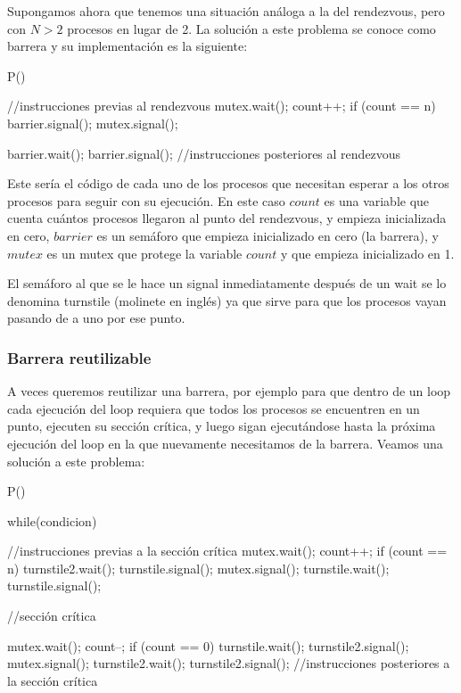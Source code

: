 \documentclass{article}
\begin{document}
Supongamos ahora que tenemos una situaci\'on an\'aloga a la del rendezvous, pero con $N > 2$ procesos en lugar de 2. La soluci\'on a este problema se conoce como barrera y su implementaci\'on es la siguiente:

\begin{code}
P()
{
    //instrucciones previas al rendezvous
    mutex.wait();
    count++;
    if (count == n)
        barrier.signal();
    mutex.signal();
    
    barrier.wait();
    barrier.signal();
    //instrucciones posteriores al rendezvous
}
\end{code}

Este ser\'ia el c\'odigo de cada uno de los procesos que necesitan esperar a los otros procesos para seguir con su ejecuci\'on. En este caso $count$ es una variable que cuenta cu\'antos procesos llegaron al punto del rendezvous, y empieza inicializada en cero, $barrier$ es un sem\'aforo que empieza inicializado en cero (la barrera), y $mutex$ es un mutex que protege la variable $count$ y que empieza inicializado en 1.

El sem\'aforo al que se le hace un signal inmediatamente despu\'es de un wait se lo denomina turnstile (molinete en ingl\'es) ya que sirve para que los procesos vayan pasando de a uno por ese punto.

\subsubsection{Barrera reutilizable}

A veces queremos reutilizar una barrera, por ejemplo para que dentro de un loop cada ejecuci\'on del loop requiera que todos los procesos se encuentren en un punto, ejecuten su secci\'on cr\'itica, y luego sigan ejecut\'andose hasta la pr\'oxima ejecuci\'on del loop en la que nuevamente necesitamos de la barrera. Veamos una soluci\'on a este problema:

\begin{code}
P()
{
    while(condicion)
		{
		    //instrucciones previas a la sección crítica
		    mutex.wait();
				    count++;
						if (count == n)
						{
						    turnstile2.wait();
								turnstile.signal();
						}
				mutex.signal();
				turnstile.wait();
				turnstile.signal();
				
				//sección crítica
				
				mutex.wait();
				    count--;
						if (count == 0)
						{
						    turnstile.wait();
								turnstile2.signal();
						}
				mutex.signal();
				turnstile2.wait();
				turnstile2.signal();
				//instrucciones posteriores a la sección crítica
		}
}
\end{code}
\end{document}
